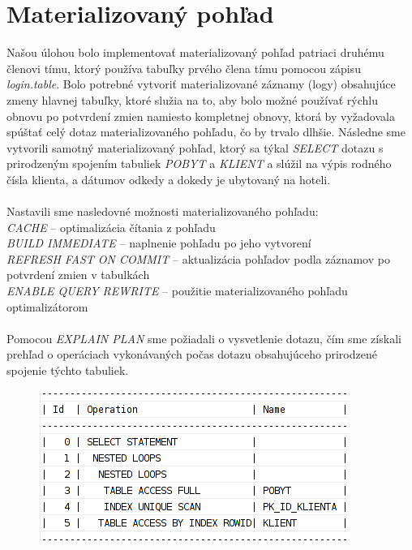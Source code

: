 \documentclass[a4paper,11pt,titlepage]{article}[11.3.2016]
\begin{document}
\section{Materializovaný pohľad}
Našou úlohou bolo implementovať materializovaný pohľad patriaci druhému členovi tímu, ktorý používa tabuľky prvého člena tímu pomocou zápisu \textit{login.table}. Bolo potrebné vytvoriť materializované záznamy (logy) obsahujúce zmeny hlavnej tabuľky, ktoré služia na to, aby bolo možné používať rýchlu obnovu po potvrdení zmien namiesto kompletnej obnovy, ktorá by vyžadovala spúštať celý dotaz materializovaného pohľadu, čo by trvalo dlhšie. Následne sme vytvorili samotný materializovaný pohľad, ktorý sa týkal \textit{SELECT} dotazu s prirodzeným spojením tabuliek \textit{POBYT} a \textit{KLIENT} a slúžil na výpis rodného čísla klienta, a dátumov odkedy a dokedy je ubytovaný na hoteli.\\ 
\\
Nastavili sme nasledovné možnosti materializovaného pohľadu:\\
\noindent
\textit{CACHE} -- optimalizácia čítania z pohľadu\\
\textit{BUILD IMMEDIATE} -- naplnenie pohľadu po jeho vytvorení\\
\textit{REFRESH FAST ON COMMIT} -- aktualizácia pohľadov podla záznamov po potvrdení zmien v tabulkách\\
\textit{ENABLE QUERY REWRITE} -- použitie materializovaného pohľadu optimalizátorom\\
\\
Pomocou \textit{EXPLAIN PLAN} sme požiadali o vysvetlenie dotazu, čím sme získali prehľad o operáciach vykonávaných počas dotazu obsahujúceho prirodzené spojenie týchto tabuliek. 

\begin{center}
\begin{figure}[h]
    \includegraphics{nomatview.png}
\end{figure}
\end{center}
\end{document}
